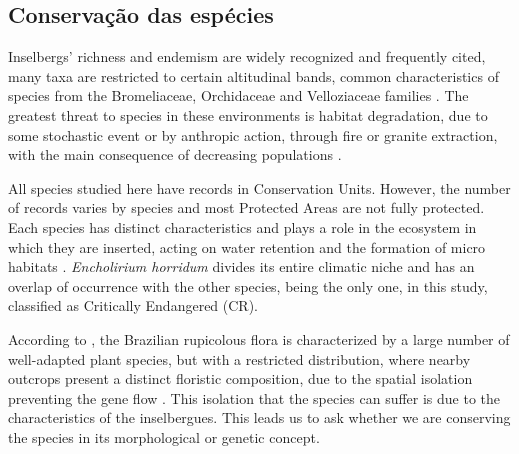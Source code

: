 

\subsection{Conservação das espécies}

Inselbergs' richness and endemism are widely recognized and frequently cited, many taxa are restricted to certain altitudinal bands, common characteristics of species from the Bromeliaceae, Orchidaceae and Velloziaceae families \citep{barbara2007PopulationDifferentiationSpecies,giulietti2005BiodiversityConservationPlants, martinelli1989CamposAltitude, mello-silva2011FiveVicariousGenera, meninineto2012BiogeographyConservationStatus,porembski2007TropicalInselbergsHabitat, porembski1998DiversityEcologySaxicolous}. The greatest threat to species in these environments is habitat degradation, due to some stochastic event or by anthropic action, through fire or granite extraction, with the main consequence of decreasing populations \citep{forzza1998EncholiriumUmGenero}.

All species studied here have records in Conservation Units. However, the number of records varies by species and most Protected Areas are not fully protected. Each species has distinct characteristics and plays a role in the ecosystem in which they are inserted, acting on water retention and the formation of micro habitats \citep{depaula2016SugarLoafLand, sampaio2004DirectionalGrowthClonal}. \textit{Encholirium horridum} divides its entire climatic niche and has an overlap of occurrence with the other species, being the only one, in this study, classified as Critically Endangered (CR).

According to \citet{barthlott1993RemarksVegetationTropical}, the Brazilian rupicolous flora is characterized by a large number of well-adapted plant species, but with a restricted distribution, where nearby outcrops present a distinct floristic composition, due to the spatial isolation preventing the gene flow \citep{barbara2008WithinpopulationSpatialGenetic, boisselier-dubayle2010GeneticStructureXerophilous, hmeljevski2017PlantPopulationsDistinct}. This isolation that the species can suffer is due to the characteristics of the inselbergues. This leads us to ask whether we are conserving the species in its morphological or genetic concept.

